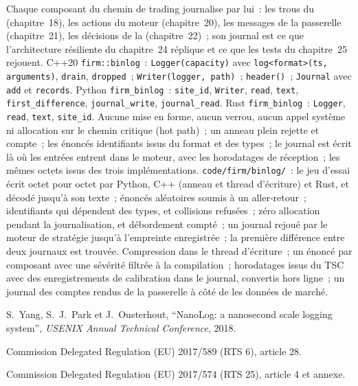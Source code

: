 \begin{build}
 Chaque composant du chemin de trading journalise par lui~: les trous du  (chapitre~18), les actions du
moteur (chapitre~20), les messages de la passerelle (chapitre~21), les décisions de la  (chapitre~22)~; son journal est ce que
l'architecture résiliente du chapitre~24 réplique et ce que les tests du chapitre~25 rejouent.
 C++20 \texttt{firm::binlog}~: \texttt{Logger(capacity)} avec \texttt{log<\textquotedbl{}format\textquotedbl{}>(ts, arguments)},
\texttt{drain}, \texttt{dropped}~; \texttt{Writer(logger, path)}~; \texttt{header()}~; \texttt{Journal} avec \texttt{add} et
\texttt{records}. Python \texttt{firm\_binlog}~: \texttt{site\_id}, \texttt{Writer}, \texttt{read}, \texttt{text},
\texttt{first\_difference}, \texttt{journal\_write}, \texttt{journal\_read}. Rust \texttt{firm\_binlog}~: \texttt{Logger},
\texttt{read}, \texttt{text}, \texttt{site\_id}.
 Aucune mise en forme, aucun verrou, aucun appel système ni allocation sur le chemin critique (hot path)~; un anneau plein rejette et compte~; les énoncés
identifiants issus du format et des types~; le journal est écrit là où les entrées entrent dans le moteur, avec les horodatages de réception~; les
mêmes octets issus des trois implémentations.
 \texttt{code/firm/binlog/}~: le jeu d'essai écrit octet pour octet par Python, C++ (anneau et thread d'écriture)
et Rust, et décodé jusqu'à son texte~; énoncés aléatoires soumis à un aller-retour~; identifiants qui dépendent des types, et collisions
refusées~; zéro allocation pendant la journalisation, et débordement compté~; un journal rejoué par le moteur de stratégie jusqu'à l'empreinte
enregistrée~; la première différence entre deux journaux est trouvée.
 Compression dans le thread d'écriture~; un énoncé par composant avec une sévérité filtrée à la compilation~;
horodatages issus du TSC avec des enregistrements de calibration dans le journal, convertis hors ligne~; un journal des comptes rendus de la passerelle à côté de
les données de marché.
\end{build}

\begin{omsources}
\item S.~Yang, S.~J.~Park et J.~Ousterhout, ``NanoLog: a nanosecond scale logging system'', \emph{USENIX Annual Technical
Conference}, 2018.
\item Commission Delegated Regulation (EU) 2017/589 (RTS 6), article 28.
\item Commission Delegated Regulation (EU) 2017/574 (RTS 25), article 4 et annexe.
\end{omsources}

